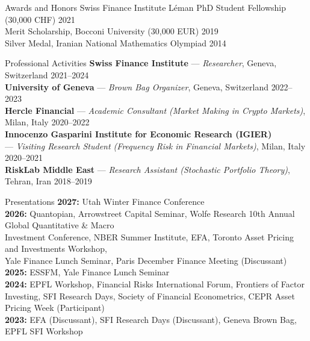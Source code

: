 \documentclass{resume}
\begin{document}
\begin{rSection}{Awards and Honors}
Swiss Finance Institute Léman PhD Student Fellowship (30,000 CHF) \hfill {2021} \\
Merit Scholarship, Bocconi University (30,000 EUR) \hfill {2019} \\
Silver Medal, Iranian National Mathematics Olympiad \hfill {2014}
\end{rSection}

\newpage

\begin{rSection}{Professional Activities}
{\bf Swiss Finance Institute} — \textit{Researcher}, Geneva, Switzerland \hfill {2021–2024} \\
{\bf University of Geneva} — \textit{Brown Bag Organizer}, Geneva, Switzerland \hfill {2022–2023} \\
{\bf Hercle Financial} — \textit{Academic Consultant (Market Making in Crypto Markets)}, Milan, Italy \hfill {2020–2022} \\
{\bf Innocenzo Gasparini Institute for Economic Research (IGIER)} \\— \textit{Visiting Research Student (Frequency Risk in Financial Markets)}, Milan, Italy \hfill {2020–2021} \\
{\bf RiskLab Middle East} — \textit{Research Assistant (Stochastic Portfolio Theory)}, Tehran, Iran \hfill {2018–2019}
\end{rSection}

\begin{rSection}{Presentations}
{\bf 2027:} Utah Winter Finance Conference \\
{\bf 2026:} Quantopian, Arrowstreet Capital Seminar, Wolfe Research 10th Annual Global Quantitative \& Macro \\
Investment Conference, NBER Summer Institute, EFA, Toronto Asset Pricing and Investments Workshop, \\
Yale Finance Lunch Seminar, Paris December Finance Meeting (Discussant) \\
{\bf 2025:} ESSFM, Yale Finance Lunch Seminar \\
{\bf 2024:} EPFL Workshop, Financial Risks International Forum, Frontiers of Factor Investing, SFI Research Days, Society of Financial Econometrics, CEPR Asset Pricing Week (Participant) \\
{\bf 2023:} EFA (Discussant), SFI Research Days (Discussant), Geneva Brown Bag, EPFL SFI Workshop
\end{rSection}
\end{document}

